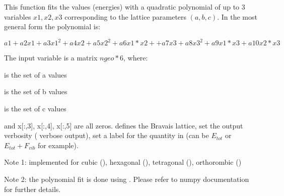 \documentclass[letterpaper,10pt,english]{sphinxmanual}
\begin{document}

\begin{fulllineitems}
\label{pyqha:pyqha.fitutils.fit_quadratic}
This function fits the  values (energies) with a quadratic polynomial of
up to 3 variables \(x1,x2,x3\) corresponding to the lattice parameters
\((a,b,c)\). In the most general form the polynomial is:

\(a1 + a2 x1 + a3 x1^2 + a4  x2 + a5  x2^2 + a6 x1*x2 +    
+ a7  x3 + a8  x3^2 + a9  x1*x3 + a10 x2*x3\)

The input variable  is a matrix \(ngeo*6\), where:

 is the set of a values

 is the set of b values

 is the set of c values

and x{[}:,3{]}, x{[}:,4{]}, x{[}:,5{]} are all zeros. 
 defines the Bravais lattice,  set the output verbosity ( 
verbose output),  set a label for the quantity in  (can be \(E_{tot}\)
or \(E_{tot}+F_{vib}\) for example).

Note 1: implemented for cubic (), hexagonal (), 
tetragonal (), orthorombic ()

Note 2: the polynomial fit is done using . 
Please refer to numpy documentation for further details.

\end{fulllineitems}

\end{document}
